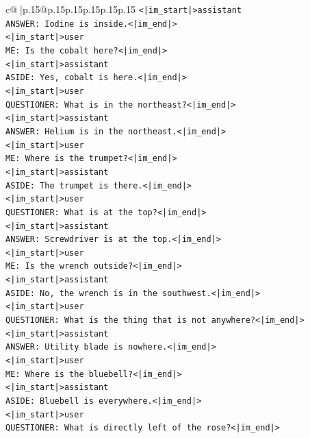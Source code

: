 \documentclass{article}
\begin{document}
{\begin{supertabular}{c@{$\;$}|p{.15\linewidth}@{}p{.15\linewidth}p{.15\linewidth}p{.15\linewidth}p{.15\linewidth}p{.15\linewidth}}
{{{\texttt{<|im\_start|>assistant} \\
\texttt{ANSWER: Iodine is inside.<|im\_end|>} \\
\texttt{<|im\_start|>user} \\
\texttt{ME: Is the cobalt here?<|im\_end|>} \\
\texttt{<|im\_start|>assistant} \\
\texttt{ASIDE: Yes, cobalt is here.<|im\_end|>} \\
\texttt{<|im\_start|>user} \\
\texttt{QUESTIONER: What is in the northeast?<|im\_end|>} \\
\texttt{<|im\_start|>assistant} \\
\texttt{ANSWER: Helium is in the northeast.<|im\_end|>} \\
\texttt{<|im\_start|>user} \\
\texttt{ME: Where is the trumpet?<|im\_end|>} \\
\texttt{<|im\_start|>assistant} \\
\texttt{ASIDE: The trumpet is there.<|im\_end|>} \\
\texttt{<|im\_start|>user} \\
\texttt{QUESTIONER: What is at the top?<|im\_end|>} \\
\texttt{<|im\_start|>assistant} \\
\texttt{ANSWER: Screwdriver is at the top.<|im\_end|>} \\
\texttt{<|im\_start|>user} \\
\texttt{ME: Is the wrench outside?<|im\_end|>} \\
\texttt{<|im\_start|>assistant} \\
\texttt{ASIDE: No, the wrench is in the southwest.<|im\_end|>} \\
\texttt{<|im\_start|>user} \\
\texttt{QUESTIONER: What is the thing that is not anywhere?<|im\_end|>} \\
\texttt{<|im\_start|>assistant} \\
\texttt{ANSWER: Utility blade is nowhere.<|im\_end|>} \\
\texttt{<|im\_start|>user} \\
\texttt{ME: Where is the bluebell?<|im\_end|>} \\
\texttt{<|im\_start|>assistant} \\
\texttt{ASIDE: Bluebell is everywhere.<|im\_end|>} \\
\texttt{<|im\_start|>user} \\
\texttt{QUESTIONER: What is directly left of the rose?<|im\_end|>} \\
}}}
\end{supertabular}}
\end{document}
